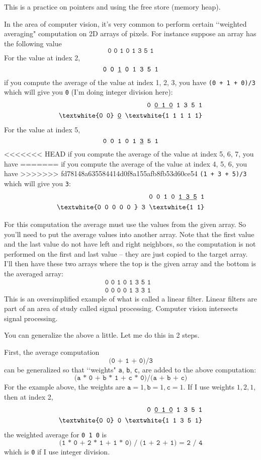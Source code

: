
This is a practice on pointers and using the free store (memory heap).

In the area of computer vision, it's very common to perform
certain \lq\lq weighted averaging" computation on 2D arrays of pixels.
For instance suppose an array has the following value
\[
\texttt{0 0 1 0 1 3 5 1}
\]
For the value at index 2, 
\[
\texttt{0 0 \underline{1} 0 1 3 5 1}
\]
if you compute the average of the value at index 1, 2, 3, you have
\verb!(0 + 1 + 0)/3! which will give you \verb!0! (I'm doing
integer division here):
\begin{align*}
\texttt{0 \underline{0 1 0} 1 3 5 1} & \\
\texttt{\textwhite{0 0} \underline{0} \textwhite{1 1 1 1 1}} &
\end{align*}
For the value at index 5, 
\[
\texttt{0 0 1 0 1 \underline{3} 5 1}
\]
<<<<<<< HEAD
if you compute the average of the value at index 5, 6, 7, you have
=======
if you compute the average of the value at index 4, 5, 6, you have
>>>>>>> fd78148a635584414d0f8a155afb8fb53d60ce54
\verb!(1 + 3 + 5)/3! which will give you \verb!3!:
\begin{align*}
\texttt{0 0 1 0 \underline{1 3 5} 1} & \\
\texttt{\textwhite{0 0 0 0 0 } 3 \textwhite{1 1}} &
\end{align*}

For this computation the average must use the values from the given array.
So you'll need to put the average values into another array.
Note that the first value and the last value do not have left and right
neighbors, so the computation is not performed on the first and last value
-- they are just copied to the target array.
I'll then have these two arrays where the top is the given array
and the bottom is the averaged array:
\begin{align*}
\texttt{0 0 1 0 1 3 5 1} & \\
\texttt{0 0 0 0 1 3 3 1} &
\end{align*}
This is an oversimplified example of what is called a linear
filter.
Linear filters are part of an area of study called signal processing.
Computer vision intersects signal processing.

You can generalize the above a little.
Let me do this in 2 steps.

First,
the average computation
\[
\texttt{(0 + 1 + 0)/3}
\]
can be generalized so that \lq\lq weights"
\verb!a!,
\verb!b!,
\verb!c!,
are added to the above computation:
\[
\texttt{(a * 0 + b * 1 + c * 0)/(a + b + c)}
\]
For the example above, the weights are
$\texttt{a}=1,\texttt{b}=1,\texttt{c}=1$.
If I use weights $1,2,1$, then at index 2,
\begin{align*}
\texttt{0 \underline{0 1 0} 1 3 5 1} & \\
\texttt{\textwhite{0 0} 0 \textwhite{1 1 3 5 1}} &
\end{align*}
the weighted average for \verb!0 1 0! is
\[
\texttt{(1 * 0 + 2 * 1 + 1 * 0) / (1 + 2 + 1) = 2 / 4}
\]
which is \verb!0! if I use integer division.

